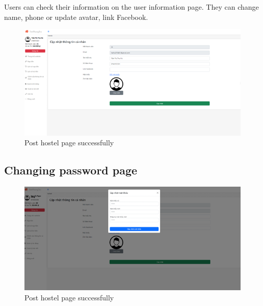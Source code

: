 \documentclass[../Main.tex]{subfiles}
\begin{document}
Users can check their information on the user information page.
They can change name, phone or update avatar, link Facebook.

\begin{figure}[H]
    \centering
    \includegraphics[width=\textwidth]{Figure/Picture39.png}
    \caption{Post hostel page successfully}
\end{figure}

\subsection{Changing password page }

\begin{figure}[H]
    \centering
    \includegraphics[width=\textwidth]{Figure/Picture40.png}
    \caption{Post hostel page successfully}
\end{figure}
\end{document}
